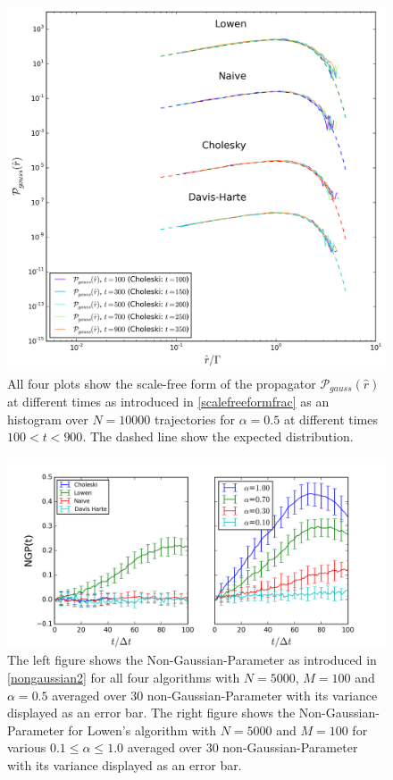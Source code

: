 \documentclass[
  a4paper,BCOR10mm,oneside,
  headsepline,footsepline,%
  fleqn,openbib
]{scrbook}
\begin{document}
\begin{figure}[h!]
\centering
\includegraphics[width=\textwidth]{./data/scaledfunctionneu12.png}
\caption{All four plots show the scale-free form of the propagator $\mathcal{P}_{gauss}(\hat{r})$ at different times as introduced in \cref{scalefreeformfrac} as an histogram over $N=10000$ trajectories for $\alpha=0.5$ at different times $100<t<900$. The dashed line show the expected distribution.}
\label{rescaledfunction}
\end{figure}
\begin{figure}[h]
\centering
\includegraphics[width=\textwidth]{./data/nongaussianlowenalphaneu.png}
\caption{ The left figure shows the Non-Gaussian-Parameter as introduced in \cref{nongaussian2} for all four algorithms with  $N=5000$, $M=100$ and $\alpha=0.5$   averaged over $30$ non-Gaussian-Parameter with its variance displayed as an error bar.\newline
The right figure shows the Non-Gaussian-Parameter for Lowen's algorithm with  $N=5000$ and $M=100$ for various $0.1\leq\alpha\leq1.0$ averaged over $30$ non-Gaussian-Parameter with its variance displayed as an error bar.}
\label{nongaussianlowen}
\end{figure}
\end{document}
